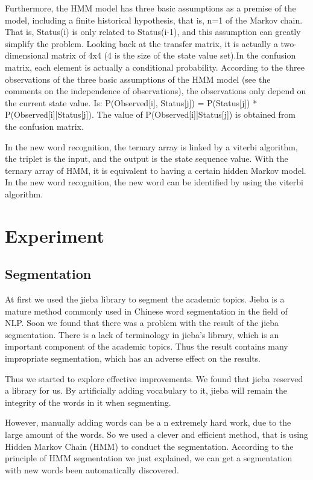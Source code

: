 \documentclass{acmtog} %
\begin{document}
Furthermore, the HMM model has three basic assumptions as a premise of the model, including a finite historical hypothesis, that is, n=1 of the Markov chain. That is, Status(i) is only related to Status(i-1), and this assumption can greatly simplify the problem. Looking back at the transfer matrix, it is actually a two-dimensional matrix of 4x4 (4 is the size of the state value set).In the confusion matrix, each element is actually a conditional probability. According to the three observations of the three basic assumptions of the HMM model (see the comments on the independence of observations), the observations only depend on the current state value. Is:
P(Observed[i], Status[j]) = P(Status[j]) * P(Observed[i]|Status[j]). The value of P(Observed[i]|Status[j]) is obtained from the confusion matrix.


In the new word recognition, the ternary array is linked by a viterbi algorithm, the triplet is the input, and the output is the state sequence value. With the ternary array of HMM, it is equivalent to having a certain hidden Markov model. In the new word recognition, the new word can be identified by using the viterbi algorithm.




\section{Experiment}
\label{sec:proposed_model}

\subsection{Segmentation}

At first we used the jieba library to segment the academic topics. Jieba is a mature method commonly used in Chinese word segmentation in the field of NLP. Soon we found that there was a problem with the result of the jieba segmentation. There is a lack of terminology in jieba's library, which is an important component of the academic topics. Thus the result contains many impropriate segmentation, which has an adverse effect on the results.

Thus we started to explore effective improvements. We found that jieba reserved a library for us. By artificially adding vocabulary to it, jieba will remain the integrity of the words in it when segmenting.

However, manually adding words can be a n extremely hard work, due to the large amount of the words. So we used a clever and efficient method, that is using Hidden Markov Chain (HMM) to conduct the segmentation. According to the principle of HMM segmentation we just explained, we can get a segmentation with new words been automatically discovered.
\end{document}
